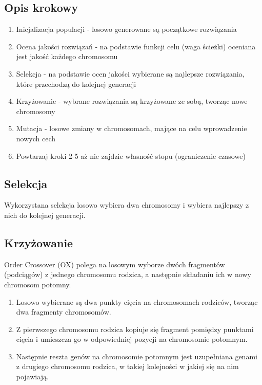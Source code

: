 \documentclass{article}
\begin{document}
\subsection{Opis krokowy}
\begin{enumerate}
    \item Inicjalizacja populacji - losowo generowane są początkowe rozwiązania
    \item Ocena jakości rozwiązań - na podstawie funkcji celu (waga ścieżki) oceniana jest jakość każdego chromosomu
    \item Selekcja - na podstawie ocen jakości wybierane są najlepsze rozwiązania, które przechodzą do kolejnej generacji
    \item Krzyżowanie - wybrane rozwiązania są krzyżowane ze sobą, tworząc nowe chromosomy
    \item Mutacja - losowe zmiany w chromosomach, mające na celu wprowadzenie nowych cech
    \item Powtarzaj kroki 2-5 aż nie zajdzie własność stopu (ograniczenie czasowe)
\end{enumerate}

\subsection{Selekcja}
Wykorzystana selekcja losowo wybiera dwa chromosomy i wybiera najlepszy z nich do kolejnej generacji.

\subsection{Krzyżowanie}
Order Crossover (OX) polega na losowym wyborze dwóch fragmentów (podciągów) z jednego chromosomu rodzica, a następnie składaniu ich w nowy chromosom potomny.

\begin{enumerate}
    \item Losowo wybierane są dwa punkty cięcia na chromosomach rodziców, tworząc dwa fragmenty chromosomów.
    \item Z pierwszego chromosomu rodzica kopiuje się fragment pomiędzy punktami cięcia i umieszcza go w odpowiedniej pozycji na chromosomie potomnym.
    \item Następnie reszta genów na chromosomie potomnym jest uzupełniana genami z drugiego chromosomu rodzica, w takiej kolejności w jakiej się na nim pojawiają.
\end{enumerate}
\end{document}
